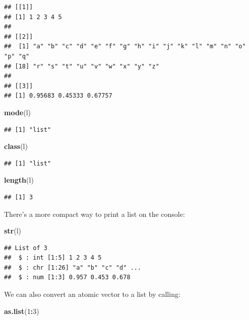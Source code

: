 \documentclass[10pt,b5paper,krantz1]{krantz}
\newenvironment{Shaded}{\begin{snugshade}}{\end{snugshade}}
\newcommand{\DecValTok}[1]{\textcolor[rgb]{0.06,0.06,0.06}{#1}}
\newcommand{\KeywordTok}[1]{\textcolor[rgb]{0.27,0.27,0.27}{\textbf{#1}}}
\newcommand{\NormalTok}[1]{#1}
\newcommand{\OperatorTok}[1]{\textcolor[rgb]{0.43,0.43,0.43}{\textbf{#1}}}
\begin{document}
\begin{verbatim}
## [[1]]
## [1] 1 2 3 4 5
## 
## [[2]]
##  [1] "a" "b" "c" "d" "e" "f" "g" "h" "i" "j" "k" "l" "m" "n" "o" "p" "q"
## [18] "r" "s" "t" "u" "v" "w" "x" "y" "z"
## 
## [[3]]
## [1] 0.95683 0.45333 0.67757
\end{verbatim}

\begin{Shaded}
\begin{Highlighting}[]
\KeywordTok{mode}\NormalTok{(l)}
\end{Highlighting}
\end{Shaded}

\begin{verbatim}
## [1] "list"
\end{verbatim}

\begin{Shaded}
\begin{Highlighting}[]
\KeywordTok{class}\NormalTok{(l)}
\end{Highlighting}
\end{Shaded}

\begin{verbatim}
## [1] "list"
\end{verbatim}

\begin{Shaded}
\begin{Highlighting}[]
\KeywordTok{length}\NormalTok{(l)}
\end{Highlighting}
\end{Shaded}

\begin{verbatim}
## [1] 3
\end{verbatim}

There's a more compact way to print a list on the console:

\begin{Shaded}
\begin{Highlighting}[]
\KeywordTok{str}\NormalTok{(l)}
\end{Highlighting}
\end{Shaded}

\begin{verbatim}
## List of 3
##  $ : int [1:5] 1 2 3 4 5
##  $ : chr [1:26] "a" "b" "c" "d" ...
##  $ : num [1:3] 0.957 0.453 0.678
\end{verbatim}

We can also convert an atomic vector to a list by calling:

\begin{Shaded}
\begin{Highlighting}[]
\KeywordTok{as.list}\NormalTok{(}\DecValTok{1}\OperatorTok{:}\DecValTok{3}\NormalTok{)}
\end{Highlighting}
\end{Shaded}
\end{document}
